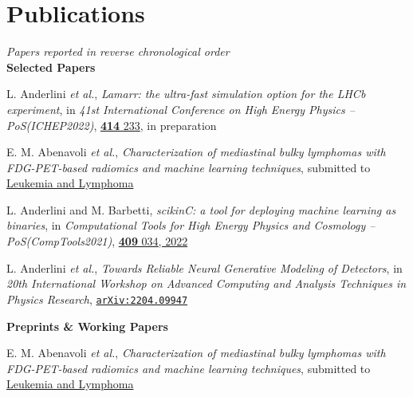 \newcommand{\journal}[1]
  {\textbf{\large #1}\\\vspace{-5mm}}

\newcommand{\arxiv}[1]
  {\href{https://arxiv.org/abs/#1}{\texttt{arXiv:#1}}}


\section*{Publications}
\begin{cvcontent}
  \emph{Papers reported in reverse chronological order}\\[3mm]
 \journal{Selected Papers}
 \begin{enumerate}[label={[\arabic*]}, leftmargin=1.5cm]
    \item L. Anderlini \emph{et al.},
    \emph{Lamarr: the ultra-fast simulation option for the LHCb experiment},
    in \emph{41st International Conference on High Energy Physics -- PoS(ICHEP2022)},
    \href{https://doi.org/10.22323/1.414.0233}{\textbf{414} 233}, in preparation
    \item E. M. Abenavoli \emph{et al.},
    \emph{Characterization of mediastinal bulky lymphomas with FDG-PET-based radiomics and machine learning techniques},
    submitted to \href{https://www.tandfonline.com/toc/ilal20/current}{Leukemia and Lymphoma}
    \item L. Anderlini and M. Barbetti, 
    \emph{scikinC: a tool for deploying machine learning as binaries}, 
    in \emph{Computational Tools for High Energy Physics and Cosmology -- PoS(CompTools2021)}, 
    \href{https://doi.org/10.22323/1.409.0034}{\textbf{409} 034, 2022}
    \item L. Anderlini \emph{et al.},
    \emph{Towards Reliable Neural Generative Modeling of Detectors},
    in \emph{20th International Workshop on Advanced Computing and Analysis Techniques in Physics Research},
    \arxiv{2204.09947}
 \end{enumerate}
 \newpage\noindent
  \journal{Preprints \& Working Papers}
  \begin{enumerate}[label={[\arabic*]}, leftmargin=1.5cm]
    \item E. M. Abenavoli \emph{et al.},
    \emph{Characterization of mediastinal bulky lymphomas with FDG-PET-based radiomics and machine learning techniques},
    submitted to \href{https://www.tandfonline.com/toc/ilal20/current}{Leukemia and Lymphoma}

\end{enumerate}
\end{cvcontent}
